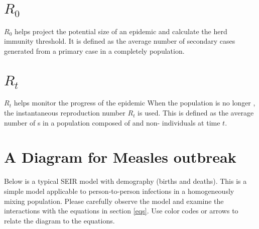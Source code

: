 \documentclass{article}
\begin{document}
\section{\( R_0 \)}
\( R_0 \) helps project the potential 
size of an epidemic and calculate the herd immunity threshold.
It is defined as the average number of \underline{\hspace{2cm}} secondary cases 
generated from a primary case in a completely 
\underline{\hspace{3cm}} population. 

\section{\( R_t \)}
\( R_t \) 
helps monitor the progress of the epidemic 
When the population is no longer \underline{\hspace{2cm}}, the instantaneous 
reproduction number \( R_t \) is used. This is defined as the average number 
of s\underline{\hspace{2cm}} in a population composed of 
\underline{\hspace{2cm}} and non-\underline{\hspace{2cm}} individuals at time \( t \).

\section{A Diagram for Measles outbreak}

Below is a typical SEIR model with demography (births and deaths). This is a simple 
model applicable to person-to-person infections in a homogeneously mixing population.
Please carefully observe the model and examine the interactions with the equations 
in section \ref{eqs}.  Use color codes or arrows to relate the diagram to the equations.


\begin{center}
\end{center}
\end{document}
